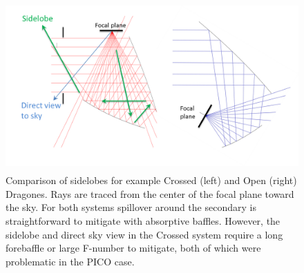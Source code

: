 \documentclass[]{spie}  %
\begin{document}
\begin{figure} [ht]
\begin{center}
\includegraphics[height=6.5cm]{sidelobes.png}
\end{center}
\caption { \label{fig:sidelobes} 
Comparison of sidelobes for example Crossed (left) and Open (right) Dragones.  Rays are traced from the center of the focal plane toward the sky.
For both systems spillover around the secondary is straightforward to mitigate with absorptive baffles.  However, the sidelobe and direct 
sky view in the Crossed system require a long forebaffle or large F-number to mitigate, both of which were problematic in the PICO case.}
\end{figure} 
\end{document}
